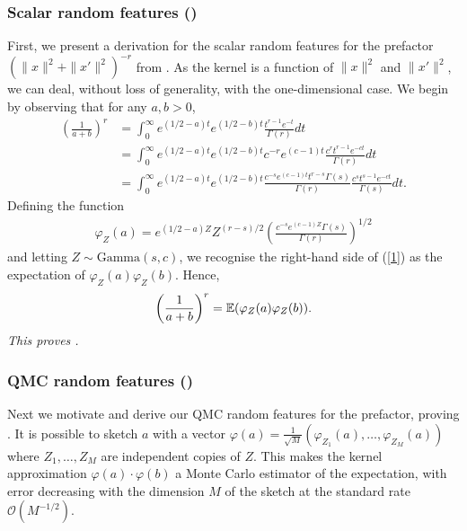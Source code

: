 \subsubsection{Scalar random features ()}
First, we present a derivation for the scalar random features for the prefactor $(\|x\|^2+\|x'\|^2)^{-r}$ from .
As the kernel is a function of $\|x\|^2$ and $\|x'\|^2$, we can deal, without loss of generality, with the one-dimensional case. We begin by observing that for any $a,b>0$,
\begin{align}
\left(\frac{1}{a+b}\right)^r 
&= \int_0^\infty e^{(1/2-a)t}e^{(1/2-b)t} \frac{t^{r-1} e^{-t}}{\Gamma(r)}dt \nonumber \\
&= \int_0^\infty e^{(1/2-a)t}e^{(1/2-b)t}c^{-r}e^{(c-1)t} \frac{c^r t^{r-1} e^{-ct}}{\Gamma(r)}dt \nonumber \\
&= \int_0^\infty e^{(1/2-a)t}e^{(1/2-b)t}\frac{c^{-s}e^{(c-1)t}t^{r-s}\Gamma(s)}{\Gamma(r)} \frac{c^s t^{s-1} e^{-ct}}{\Gamma(s)}dt. \label{1}
\end{align}
Defining the function
\begin{align*}
\varphi_Z(a) = e^{(1/2-a)Z} Z^{(r-s)/2}\left(\frac{c^{-s}e^{(c-1)Z}\Gamma(s)}{\Gamma(r)} \right)^{1/2}
\end{align*}
and letting $Z\sim\text{Gamma}(s,c)$, we recognise the right-hand side of (\ref{1}) as the expectation of $\varphi_Z(a)\varphi_Z(b)$. Hence, 
\begin{align*}
\left(\frac{1}{a+b}\right)^r = \mathbb{E}(\varphi_Z(a)\varphi_Z(b)).
\end{align*}
\emph{This proves .}

\subsubsection{QMC random features ()}
Next we motivate and derive our QMC random features for the prefactor,
proving .
It is possible to sketch $a$ with a vector
$\varphi(a) = \frac{1}{\sqrt{M}}(\varphi_{Z_1}(a),\dots,\varphi_{Z_M}(a))$
where $Z_1,\dots,Z_M$ are independent copies of $Z$.
This makes the kernel approximation $\varphi(a)\cdot \varphi(b)$
a Monte Carlo estimator of the expectation,
with error decreasing with the dimension $M$
of the sketch at the standard rate $\mathcal O(M^{-1/2})$. 

